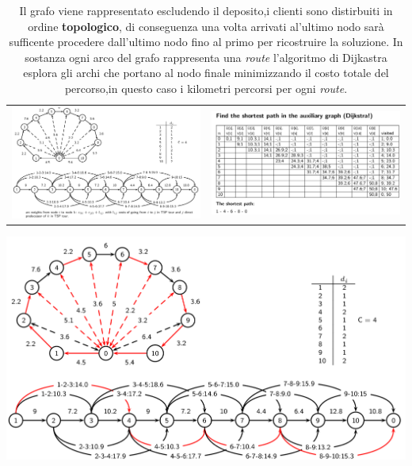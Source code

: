 \documentclass[]{article}
\begin{document}
\begin{table}
	\begin{tabular}{c|c}
		\includegraphics[scale = 0.20]{images/RFSC1.png} & 
		\includegraphics[scale = 0.20]{images/RFSC2.png}  
	
	\end{tabular}
	\begin{centering}
		\includegraphics[scale = 0.20]{images/RFSC3.png}\\	
	\end{centering}

	\caption{Il grafo viene rappresentato escludendo il deposito,i clienti sono distirbuiti in ordine \textbf{topologico}, di conseguenza una volta arrivati al'ultimo nodo sarà sufficente procedere dall'ultimo nodo fino al primo per ricostruire la soluzione. In sostanza ogni arco del grafo rappresenta una \emph{route} l'algoritmo di Dijkastra esplora gli archi che portano al nodo finale minimizzando il costo totale del percorso,in questo caso i kilometri percorsi per ogni \emph{route}. }
	\label{Table:3}
\end{table}
\end{document}
